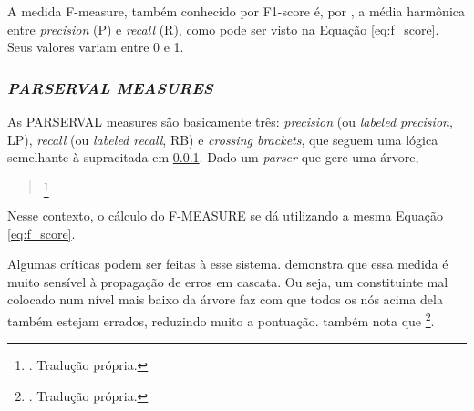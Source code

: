 A medida F-measure, também conhecido por F1-score \cite[p~262]{derczynski2016complementarity} é, por \cite[p~1]{truthFScore}, a média harmônica entre \textit{precision} (P) e \textit{recall} (R), como pode ser visto na Equação \ref{eq:f_score}. Seus valores variam entre 0 e 1. 
\begin{center}
    
\end{center}


\subsubsection{\textit{PARSERVAL MEASURES}}
\label{subsec:parseval}
As PARSERVAL measures são basicamente três: \textit{precision} (ou \textit{labeled precision}, LP), \textit{recall} (ou \textit{labeled recall}, RB) e \textit{crossing brackets}, que seguem uma lógica semelhante à supracitada em \ref{subsec:parseval}. Dado um \textit{parser} que gere uma árvore, \cite[p~433-434]{Manning1999FoundationsNLP}
\begin{quote}
    \footnote{. Tradução própria.}
\end{quote}
\begin{center}
    
\end{center}

Nesse contexto, o cálculo do F-MEASURE se dá utilizando a mesma Equação \ref{eq:f_score}.

Algumas críticas podem ser feitas à esse sistema.  demonstra que essa medida é muito sensível à propagação de erros em cascata. Ou seja, um constituinte mal colocado num nível mais baixo da árvore faz com que todos os nós acima dela também estejam errados, reduzindo muito a pontuação.  também nota que 
\footnote{. Tradução própria.}.

